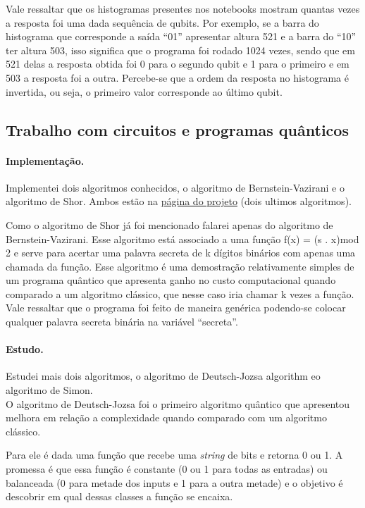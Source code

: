 \documentclass{article}
\begin{document}
        Vale ressaltar que os histogramas presentes nos notebooks mostram quantas vezes a resposta foi uma dada sequência de qubits. Por exemplo, se a barra do histograma que corresponde a saída ``01'' apresentar altura 521 e a barra do ``10'' ter altura 503, isso significa que o programa foi rodado 1024 vezes, sendo que em 521 delas a resposta obtida foi 0 para o segundo qubit e 1 para o primeiro e em 503 a resposta foi a outra. Percebe-se que a ordem da resposta no histograma é invertida, ou seja, o primeiro valor corresponde ao último qubit.

    \subsection{Trabalho com circuitos e programas quânticos}

        \paragraph{Implementação.}
        Implementei dois algoritmos conhecidos, o algoritmo de Bernstein-Vazirani e o algoritmo de Shor. Ambos estão na \href{https://interscity.org/quantum-internet/}{página do projeto} (dois ultimos algoritmos). 
    
        Como o algoritmo de Shor já foi mencionado falarei apenas do algoritmo de Bernstein-Vazirani. Esse algoritmo está associado a uma função f(x) = (s . x)mod 2 e serve para acertar uma palavra secreta de k dígitos binários com apenas uma chamada da função. Esse algoritmo é uma demostração relativamente simples de um programa quântico que apresenta ganho no custo computacional quando comparado a um algoritmo clássico, que nesse caso iria chamar k vezes a função. Vale ressaltar que o programa foi feito de maneira genérica podendo-se colocar qualquer palavra secreta binária na variável ``secreta''.

        \paragraph{Estudo.}
        Estudei mais dois algoritmos, o algoritmo de Deutsch-Jozsa algorithm eo algoritmo de Simon.
        \\
       
        O algoritmo de Deutsch-Jozsa foi o primeiro algoritmo quântico que apresentou melhora em relação a complexidade quando comparado com um algoritmo clássico. 
        
        Para ele é dada uma função que recebe uma \emph{string} de bits e retorna 0 ou 1. A promessa é que essa função é constante (0 ou 1 para todas as entradas) ou balanceada (0 para metade dos inputs e 1 para a outra metade) e o objetivo é descobrir em qual dessas classes a função se encaixa.
        
\end{document}
